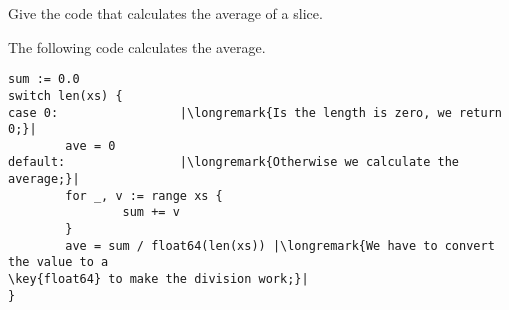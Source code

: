 \begin{Exercise}[title={Average},difficulty=4]
\label{ex:average no func}
\Question\label{ex:average no func q1} Give the code
that calculates the average of a  slice.
\end{Exercise}

\begin{Answer}
\Question The following code calculates the average.
\begin{lstlisting}
sum := 0.0 
switch len(xs) {
case 0:                 |\longremark{Is the length is zero, we return 0;}|
        ave = 0
default:                |\longremark{Otherwise we calculate the average;}|
        for _, v := range xs {
                sum += v
        }
        ave = sum / float64(len(xs)) |\longremark{We have to convert the value to a
\key{float64} to make the division work;}|
}
\end{lstlisting}
\showremarks
\end{Answer}
